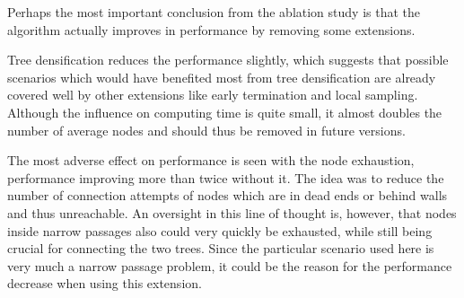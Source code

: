 \documentclass[a4paper,12pt]{article}
\begin{document}
Perhaps the most important conclusion from the ablation study is that the algorithm actually improves in performance by removing some extensions.

Tree densification reduces the performance slightly, which suggests that possible scenarios which would have benefited most from tree densification are already covered well by other extensions like early termination and local sampling.
Although the influence on computing time is quite small, it almost doubles the number of average nodes and should thus be removed in future versions.

The most adverse effect on performance is seen with the node exhaustion, performance improving more than twice without it. The idea was to reduce the number of connection attempts of nodes which are in dead ends or behind walls and thus unreachable. An oversight in this line of thought is, however, that nodes inside narrow passages also could very quickly be exhausted, while still being crucial for connecting the two trees. Since the particular scenario used here is very much a narrow passage problem, it could be the reason for the performance decrease when using this extension.
\end{document}
